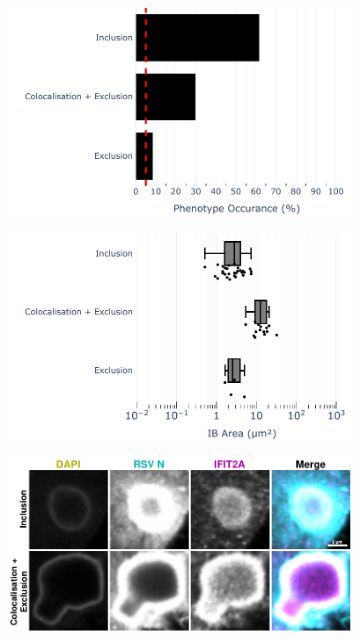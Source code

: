 \begin{figure}
    \begin{subfigure}{0.5\textwidth}
        \caption{}
        \includegraphics[width=1\linewidth]{10. Chapter 5/Figs/01. Infection/01. IFIT2A/01. bar_i2a_a549-n.pdf} 
    \end{subfigure}
    \begin{subfigure}{0.5\textwidth}
        \caption{}
        \includegraphics[width=1\linewidth]{10. Chapter 5/Figs/01. Infection/01. IFIT2A/02. box_i2a_a549-n.pdf}
    \end{subfigure}
    \begin{subfigure}{1\textwidth}
        \caption{}
        \includegraphics[width=1\linewidth]{10. Chapter 5/Figs/01. Infection/01. IFIT2A/03. i2a a549 hrsv n.pdf} 

\end{subfigure}
\end{figure}

